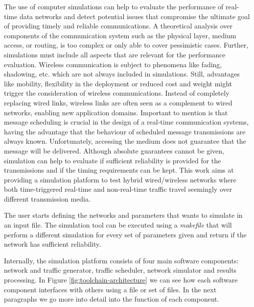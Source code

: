 \documentclass[conference]{IEEEtran}
\begin{document}
The use of computer simulations can help to evaluate the performance of real-time data networks and detect potential issues that compromise the ultimate goal of providing timely and reliable communications. A theoretical analysis over components of the communication system such as the physical layer, medium access, or routing, is too complex or only able to cover pessimistic cases. Further, simulations must include all aspects that are relevant for the performance evaluation. Wireless communication is subject to phenomena like fading, shadowing, etc. which are not always included in simulations. Still, advantages like mobility, flexibility in the deployment or reduced cost and weight might trigger the consideration of wireless communications. Instead of completely replacing wired links, wireless links are often seen as a complement to wired networks, enabling new application domains. Important to mention is that message scheduling is crucial in the design of a real-time communication systems, having the advantage that the behaviour of scheduled message transmissions are always known. Unfortunately, accessing the medium does not guarantee that the message will be delivered. Although absolute guarantees cannot be given, simulation can help to evaluate if sufficient reliability is provided for the transmissions and if the timing requirements can be kept. This work aims at providing a simulation platform to test hybrid wired/wireless networks where both time-triggered real-time and non-real-time traffic travel seemingly over different transmission media.


The user starts defining the networks and parameters that wants to simulate in an input file. The simulation tool can be executed using a \textit{makefile} that will perform a different simulation for every set of parameters given and return if the network has sufficient reliability. 

Internally, the simulation platform consists of four main software components: network and traffic generator, traffic scheduler, network simulator and results processing. In Figure \ref{fig:toolchain-architecture} we can see how each software component interfaces with others using a file or set of files. In the next paragraphs we go more into detail into the function of each component.
\end{document}

